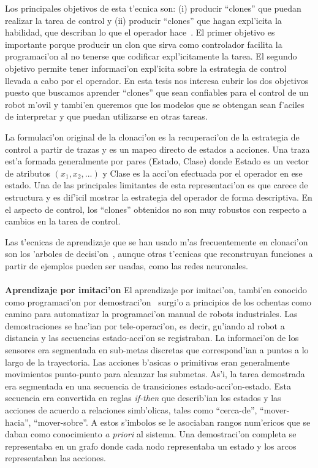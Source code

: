\documentclass[11pt]{article}
\begin{document}
Los principales objetivos de esta t'ecnica son: (i) producir ``clones'' que puedan realizar la tarea de control y (ii) producir ``clones'' que hagan expl'icita la habilidad, que describan lo que el operador hace~\cite{modellingskills}. El primer objetivo es importante porque producir un clon que sirva como controlador facilita la programaci'on al no tenerse que codificar expl'icitamente la tarea. El segundo objetivo permite tener informaci'on expl'icita sobre la estrategia de control llevada a cabo por el operador. En esta tesis nos interesa cubrir los dos objetivos puesto que buscamos aprender ``clones'' que sean confiables para el control de un robot m'ovil y tambi'en queremos que los modelos que se obtengan sean f'aciles de interpretar y que puedan utilizarse en otras tareas.  

La formulaci'on original de la \textsf{clonaci'on} es la recuperaci'on de la estrategia de control a partir de trazas y es un mapeo directo de estados a acciones. Una traza est'a formada generalmente por pares (Estado, Clase) donde Estado es un vector de atributos $(x_1,x_2,...)$ y Clase es la acci'on efectuada por el operador en ese estado. Una de las principales limitantes de esta representaci'on es que carece de estructura y es dif'icil mostrar la estrategia del operador de forma descriptiva. En el aspecto de control, los ``clones'' obtenidos no son muy robustos con respecto a cambios en la tarea de control.

Las t'ecnicas de aprendizaje que se han usado m'as frecuentemente en \textsf{clonaci'on} son los \textsf{'arboles de decisi'on}~\cite{quinlan1986}, aunque otras t'ecnicas que reconstruyan funciones a partir de ejemplos pueden ser usadas, como las redes neuronales.
 
\paragraph{}
\noindent

\textbf{Aprendizaje por imitaci'on}
 El \textsf{aprendizaje por imitaci'on}, tambi'en conocido como \textsf{programaci'on por demostraci'on}~\cite{aude:pbd} surgi'o a principios de los ochentas como camino para automatizar la programaci'on manual de robots industriales. Las demostraciones se hac'ian por tele-operaci'on, es decir, gu'iando al robot a distancia y las secuencias estado-acci'on se registraban. La informaci'on de los sensores era segmentada en sub-metas discretas que correspond'ian a puntos a lo largo de la trayectoria. Las acciones b'asicas o primitivas eran generalmente movimientos punto-punto para alcanzar las submetas. As'i, la tarea demostrada era segmentada en una secuencia de transiciones estado-acci'on-estado. Esta secuencia era convertida en reglas \textit{if-then} que describ'ian los estados y las acciones de acuerdo a relaciones simb'olicas, tales como ``cerca-de'', ``mover-hacia'', ``mover-sobre''. A estos s'imbolos se le asociaban rangos num'ericos que se daban como conocimiento \textit{a priori} al sistema.  Una demostraci'on completa se representaba en un grafo donde cada nodo representaba un estado y los arcos representaban las acciones. 
\end{document}
